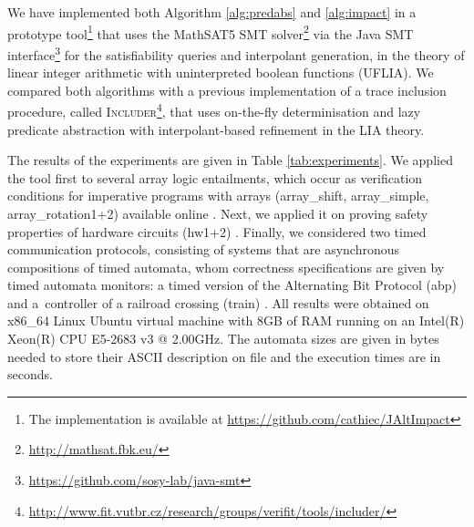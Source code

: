 \documentclass[10pt]{llncs}
\begin{document}
We have implemented both Algorithm \ref{alg:predabs} and
\ref{alg:impact} in a prototype tool\footnote{The implementation is
  available at \url{https://github.com/cathiec/JAltImpact}} that uses
the MathSAT5 SMT solver\footnote{\url{http://mathsat.fbk.eu/}} via the
Java SMT
interface\footnote{\url{https://github.com/sosy-lab/java-smt}} for the
satisfiability queries and interpolant generation, in the theory of
linear integer arithmetic with uninterpreted boolean functions
(UFLIA). We compared both algorithms with a previous implementation of
a trace inclusion procedure, called
\textsc{Includer}\footnote{\url{http://www.fit.vutbr.cz/research/groups/verifit/tools/includer/}},
that uses on-the-fly determinisation and lazy predicate abstraction
with interpolant-based refinement \cite{Tacas16} in the LIA theory.

The results of the experiments are given in Table
\ref{tab:experiments}. We applied the tool first to several array
logic entailments, which occur as verification conditions for
imperative programs with arrays \cite{cav09} (array\_shift,
array\_simple, array\_rotation1+2) available online
\cite{ntslib}. Next, we applied it on proving safety properties of
hardware circuits (hw1+2) \cite{smrcka}. Finally, we considered two
timed communication protocols, consisting of systems that are
asynchronous compositions of timed automata, whom correctness
specifications are given by timed automata monitors: a timed version
of the Alternating Bit Protocol (abp) \cite{abp} and a~controller of a
railroad crossing (train) \cite{henzinger:RealTimeSystems}. All
results were obtained on x86\_64 Linux Ubuntu virtual machine with 8GB
of RAM running on an Intel(R) Xeon(R) CPU E5-2683 v3 @ 2.00GHz. The
automata sizes are given in bytes needed to store their ASCII
description on file and the execution times are in seconds.
\end{document}
